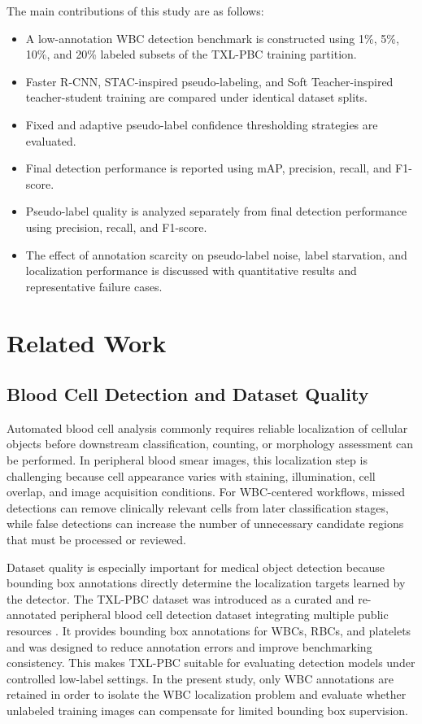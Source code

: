 \documentclass[conference,a4paper]{IEEEtran}
\begin{document}
The main contributions of this study are as follows:
\begin{itemize}
    \item A low-annotation WBC detection benchmark is constructed using 1\%, 5\%, 10\%, and 20\% labeled subsets of the TXL-PBC training partition.
    \item Faster R-CNN, STAC-inspired pseudo-labeling, and Soft Teacher-inspired teacher-student training are compared under identical dataset splits.
    \item Fixed and adaptive pseudo-label confidence thresholding strategies are evaluated.
    \item Final detection performance is reported using mAP, precision, recall, and F1-score.
    \item Pseudo-label quality is analyzed separately from final detection performance using precision, recall, and F1-score.
    \item The effect of annotation scarcity on pseudo-label noise, label starvation, and localization performance is discussed with quantitative results and representative failure cases.
\end{itemize}

\section{Related Work}

\subsection{Blood Cell Detection and Dataset Quality}
Automated blood cell analysis commonly requires reliable localization of cellular objects before downstream classification, counting, or morphology assessment can be performed. In peripheral blood smear images, this localization step is challenging because cell appearance varies with staining, illumination, cell overlap, and image acquisition conditions. For WBC-centered workflows, missed detections can remove clinically relevant cells from later classification stages, while false detections can increase the number of unnecessary candidate regions that must be processed or reviewed.

Dataset quality is especially important for medical object detection because bounding box annotations directly determine the localization targets learned by the detector. The TXL-PBC dataset was introduced as a curated and re-annotated peripheral blood cell detection dataset integrating multiple public resources \cite{gan2025txlpbc}. It provides bounding box annotations for WBCs, RBCs, and platelets and was designed to reduce annotation errors and improve benchmarking consistency. This makes TXL-PBC suitable for evaluating detection models under controlled low-label settings. In the present study, only WBC annotations are retained in order to isolate the WBC localization problem and evaluate whether unlabeled training images can compensate for limited bounding box supervision.
\end{document}
